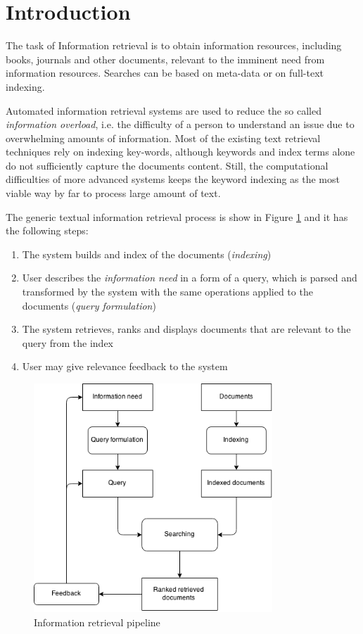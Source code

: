 \section{Introduction}

The task of Information retrieval is to obtain information resources, including books, journals and other documents, relevant to the imminent need from information resources. Searches can be based on meta-data or on full-text indexing.

Automated information retrieval systems are used to reduce the so called \textit{information overload}, i.e. the difficulty of a person to understand an issue due to overwhelming amounts of information. Most of the existing text retrieval techniques rely on indexing key-words, although keywords and index terms alone do not sufficiently capture the documents content. Still, the computational difficulties of more advanced systems keeps the keyword indexing as the most viable way by far to process large amount of text. 

The generic textual information retrieval process is show in Figure \ref{fig:IR} and it has the following steps:
\begin{enumerate}
  \item The system builds and index of the documents (\textit{indexing}) 
  \item User describes the \textit{information need} in a form of a query, which is parsed and transformed by the system with the same operations applied to the documents (\textit{query formulation})
  \item The system retrieves, ranks and displays documents that are relevant to the query from the index
  \item User may give relevance feedback to the system
\end{enumerate}
\begin{figure}[ht]
	\centering
	\includegraphics[width=0.8\textwidth]{IR.png}
	\caption{Information retrieval pipeline \citep{hiemstra2009information}}
	\label{fig:IR}
\end{figure}
\FloatBarrier

